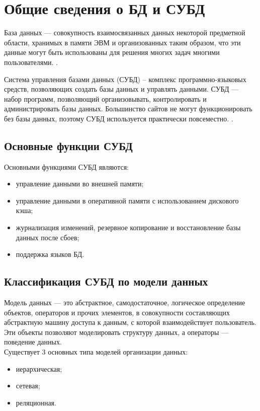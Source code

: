 \documentclass[12pt,a4paper,oneside]{report}
\begin{document}
\section{Общие сведения о БД и СУБД}
\quad База данных — совокупность взаимосвязанных данных некоторой предметной области, хранимых в памяти ЭВМ и организованных таким образом, что эти данные могут быть использованы для решения многих задач многими пользователями. \cite{lection}.

Система управления базами данных (СУБД) – комплекс программно-языковых средств, позволяющих создать базы данных и управлять данными. СУБД — набор программ, позволяющий организовывать, контролировать и администрировать базы данных. Большинство сайтов не могут функционировать без базы данных, поэтому СУБД используется практически повсеместно. \cite{subd}.

\subsection{Основные функции СУБД}
\quad Основными функциями СУБД являются:
\begin{itemize}
    \item управление данными во внешней памяти;
    \item управление данными в оперативной памяти с использованием дискового кэша;
    \item журнализация изменений, резервное копирование и восстановление базы данных после сбоев;
    \item поддержка языков БД.
\end{itemize}

\subsection{Классификация СУБД по модели данных}
\quad Модель данных — это абстрактное, самодостаточное, логическое определение объектов, операторов и прочих элементов, в совокупности составляющих абстрактную машину доступа к данным, с которой взаимодействует пользователь. Эти объекты позволяют моделировать структуру данных, а операторы — поведение данных\cite{deit}.\\

Существует 3 основных типа моделей организации данных:
\begin{itemize}
    \item иерархическая;
    \item сетевая;
    \item реляционная.
\end{itemize}
\end{document}
